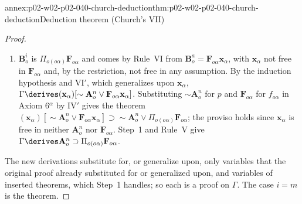\begin{annexitem}{annex:p02-w02-p02-040-church-deduction}{thm:p02-w02-p02-040-church-deduction}{Deduction theorem (Church's VII)}
\begin{proof}
\begin{enumerate}
   \(\mathbf A^n_o\supset\mathbf B^i_o\).
 \item \(\mathbf B^i_o\) is \(\Pi_{o(o\alpha)}\mathbf F_{o\alpha}\) and comes by
   Rule~VI from \(\mathbf B^a_o=\mathbf F_{o\alpha}\mathbf x_\alpha\), with
   \(\mathbf x_\alpha\) not free in \(\mathbf F_{o\alpha}\) and, by the
   restriction, not free in any assumption.  By the induction hypothesis and
   VI\('\), which generalizes upon \(\mathbf x_\alpha\),
   \(\Gamma\derives(\mathbf x_\alpha)[\sim\mathbf A^n_o\vee\mathbf F_{o\alpha}\mathbf x_\alpha]\).
   Substituting \(\sim\mathbf A^n_o\) for \(p\) and \(\mathbf F_{o\alpha}\) for
   \(f_{o\alpha}\) in Axiom 6\(^\alpha\) by IV\('\) gives the theorem
   \((\mathbf x_\alpha)[\sim\mathbf A^n_o\vee\mathbf F_{o\alpha}\mathbf x_\alpha]
   \supset\sim\mathbf A^n_o\vee\Pi_{o(o\alpha)}\mathbf F_{o\alpha}\); the
   proviso holds since \(\mathbf x_\alpha\) is free in neither
   \(\mathbf A^n_o\) nor \(\mathbf F_{o\alpha}\).  Step~1 and Rule~V give
   \(\Gamma\derives\mathbf A^n_o\supset\Pi_{o(o\alpha)}\mathbf F_{o\alpha}\).
\end{enumerate}
The new derivations substitute for, or generalize upon, only variables
that the original proof already substituted for or generalized upon, and
variables of inserted theorems, which Step~1 handles; so each is a proof
on \(\Gamma\).  The case \(i=m\) is the theorem.
\end{proof}
\end{annexitem}

